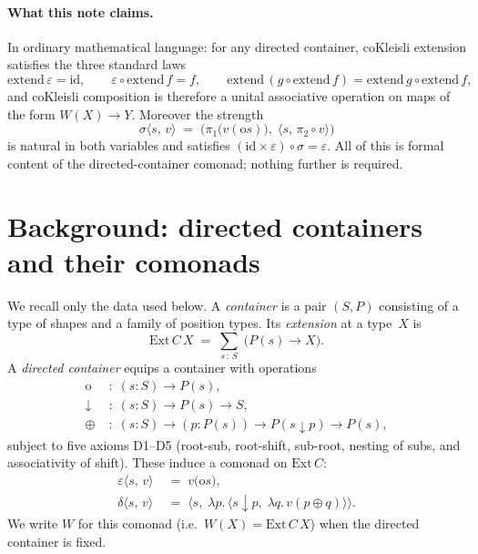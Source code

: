 \documentclass[11pt,a4paper]{article}
\theoremstyle{plain}
\theoremstyle{definition}
\newcommand{\Ext}{\mathrm{Ext}}
\newcommand{\id}{\mathrm{id}}
\newcommand{\rootp}{\mathrm{o}}
\begin{document}
\paragraph{What this note claims.}
In ordinary mathematical language: for any directed container, coKleisli
extension satisfies the three standard laws
\[
  \mathrm{extend}\,\varepsilon = \id,\qquad
  \varepsilon \circ \mathrm{extend}\,f = f,\qquad
  \mathrm{extend}\,(g \circ \mathrm{extend}\,f)
    = \mathrm{extend}\,g \circ \mathrm{extend}\,f,
\]
and coKleisli composition is therefore a unital associative operation on
maps of the form $W(X) \to Y$. Moreover the strength
\[
  \sigma\langle s,\, v\rangle
  \;=\;
  \bigl( \pi_1\bigl(v(\rootp s)\bigr),\;
         \langle s,\, \pi_2 \circ v\rangle \bigr)
\]
is natural in both variables and satisfies $(\id \times \varepsilon) \circ \sigma
= \varepsilon$. All of this is formal content of the directed-container
comonad; nothing further is required.

\section{Background: directed containers and their comonads}

We recall only the data used below. A \emph{container} is a pair $(S,P)$
consisting of a type of shapes and a family of position types. Its
\emph{extension} at a type~$X$ is
\[
  \Ext\,C\,X \;=\; \sum_{s \,:\, S}\; \bigl(P(s) \to X\bigr).
\]
A \emph{directed container} equips a container with operations
\begin{align*}
  \rootp &\;:\; (s : S) \to P(s), \\
  \downarrow &\;:\; (s : S) \to P(s) \to S, \\
  \oplus &\;:\; (s : S) \to (p : P(s)) \to P(s \downarrow p) \to P(s),
\end{align*}
subject to five axioms D1--D5 (root-sub, root-shift, sub-root, nesting of
subs, and associativity of shift). These induce a comonad on $\Ext\,C$:
\begin{align*}
  \varepsilon\langle s,\, v\rangle &\;=\; v\bigl(\rootp s\bigr), \\
  \delta\langle s,\, v\rangle
  &\;=\;
  \bigl\langle s,\;
    \lambda p.\,
      \bigl\langle s \downarrow p,\;
        \lambda q.\, v(p \oplus q)\bigr\rangle
  \bigr\rangle.
\end{align*}
We write $W$ for this comonad (i.e.\ $W(X) = \Ext\,C\,X$) when the directed
container is fixed.
\end{document}
